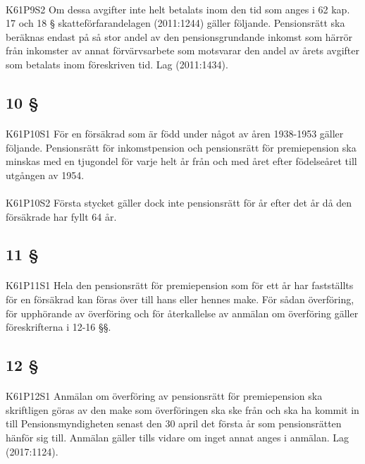 \documentclass[a4paper,notitlepage,openany,10pt]{book}
\begin{document}
\paragraph*{}
{\tiny K61P9S2}
Om dessa avgifter inte helt betalats inom den tid som anges i 62 kap. 17 och 18 § skatteförfarandelagen (2011:1244) gäller följande. Pensionsrätt ska beräknas endast på så stor andel av den pensionsgrundande inkomst som härrör från inkomster av annat förvärvsarbete som motsvarar den andel av årets avgifter som betalats inom föreskriven tid.
Lag (2011:1434).
\subsection*{10 §}
\paragraph*{}
{\tiny K61P10S1}
För en försäkrad som är född under något av åren 1938-1953 gäller följande. Pensionsrätt för inkomstpension och pensionsrätt för premiepension ska minskas med en tjugondel för varje helt år från och med året efter födelseåret till utgången av 1954.
\paragraph*{}
{\tiny K61P10S2}
Första stycket gäller dock inte pensionsrätt för år efter det år då den försäkrade har fyllt 64 år.
\subsection*{11 §}
\paragraph*{}
{\tiny K61P11S1}
Hela den pensionsrätt för premiepension som för ett år har fastställts för en försäkrad kan föras över till hans eller hennes make. För sådan överföring, för upphörande av överföring och för återkallelse av anmälan om överföring gäller föreskrifterna i 12-16 §§.
\subsection*{12 §}
\paragraph*{}
{\tiny K61P12S1}
Anmälan om överföring av pensionsrätt för premiepension ska skriftligen göras av den make som överföringen ska ske från och ska ha kommit in till Pensionsmyndigheten senast den 30 april det första år som pensionsrätten hänför sig till. Anmälan gäller tills vidare om inget annat anges i anmälan.
Lag (2017:1124).
\end{document}
